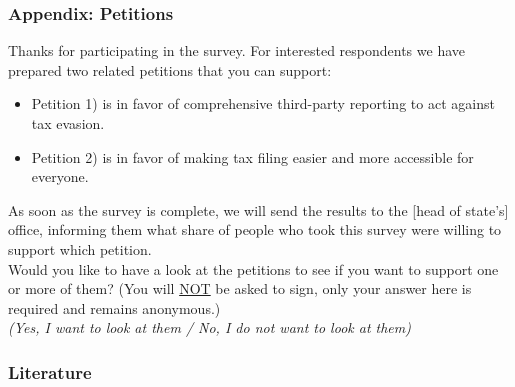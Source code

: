 \documentclass{beamer}
\begin{document}
\begin{frame}[label=Petitions_Appendix]
\frametitle{Appendix: Petitions}
\footnotesize
    Thanks for participating in the survey. For interested respondents we have prepared two related petitions that you can support: 
    \begin{itemize}
        \item Petition 1) is in favor of comprehensive third-party reporting to act against tax evasion. 
        \item Petition 2) is in favor of making tax filing easier and more accessible for everyone. 
    \end{itemize}
    As soon as the survey is complete, we will send the results to the [head of state’s] office, informing them what share of people who took this survey were willing to support which petition. \\ 
    \vspace{0.5em} 
    Would you like to have a look at the petitions to see if you want to support one or more of them? (You will \underline{NOT} be asked to sign, only your answer here is required and remains anonymous.)\\ 
\vspace{0.5em} 
\textit{(Yes, I want to look at them / No, I do not want to look at them)} 
\vfill
\hfill 
\hyperlink{Petitions}{}
\end{frame}

\begin{frame}[allowframebreaks]
  \frametitle{Literature}
  \printbibliography
\end{frame}
\end{document}
